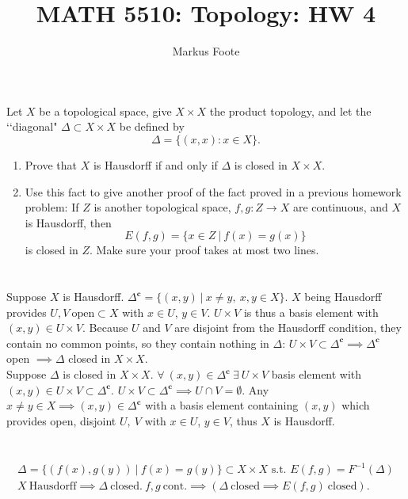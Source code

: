 \documentclass{jhwhw}
\title{MATH 5510: Topology: HW 4}
\author{Markus Foote}
\begin{document}
\problem{}%
Let $X$ be a topological space, give $X\times X$ the product topology, and let the \lq\lq diagonal"  $\Delta\subset X\times X$ be defined by 
$$
\Delta =\{ (x,x): x\in X\}.
$$
\begin{enumerate}
	
	\item Prove that $X$ is Hausdorff if and only if $\Delta$ is closed in $X\times X$.
	
	\item Use this fact to give another proof of the fact proved in a previous homework problem:  If $Z$ is another topological space, $f,g:Z\to X$ are continuous, and $X$ is Hausdorff, then
	$$
	E(f,g) = \{x\in Z \ | \ f(x) = g(x)\}
	$$ 
	is closed in $Z$.  Make sure your proof takes at most two lines.
\end{enumerate}
\solution{}
\part{}
Suppose $X$ is Hausdorff. $\Delta^{\mathbf{c}}=\{(x,y)\ | \ x\ne y,\ x,y\in X\}$. $X$ being Hausdorff provides $U,V\ \mathrm{ open }\subset X$ with $x\in U$, $y\in V$. $U\times V$ is thus a basis element with $(x,y) \in U\times V$. Because $U$ and $V$ are disjoint from the Hausdorff condition, they contain no common points, so they contain nothing in $\Delta$: $U\times V \subset \Delta^{\mathbf{c}}\implies \Delta^{\mathbf{c}}$ open $\implies \Delta$ closed in $X\times X$.
\\

Suppose $\Delta$ is closed in $X\times X$. $\forall\ (x,y)\in \Delta^{\mathbf{c}}\  \exists\ U\times V$ basis element with $(x,y)\in U\times V \subset \Delta^{\mathbf{c}}$. $U\times V \subset \Delta^{\mathbf{c}} \implies U\cap V=\emptyset$. Any $x\ne y\in X \implies (x,y)\in \Delta^{\mathbf{c}}$ with a basis element containing $(x,y)$ which provides open, disjoint $U,\ V$ with $x\in U$, $y\in V$, thus $X$ is Hausdorff.


\part{}
\begin{gather}
\Delta = \{(f(x),g(y))\ | \ f(x) = g(y)\} \subset X \times X \text{ s.t. } E(f,g) = F^{-1}(\Delta) \\
X \ \text{Hausdorff}\implies \Delta \ \text{closed.} \ f,g \ \text{cont.} \implies \left( \Delta\ \text{closed} \implies E(f,g)\ \text{closed} \right).
\end{gather}
\\
\end{document}
